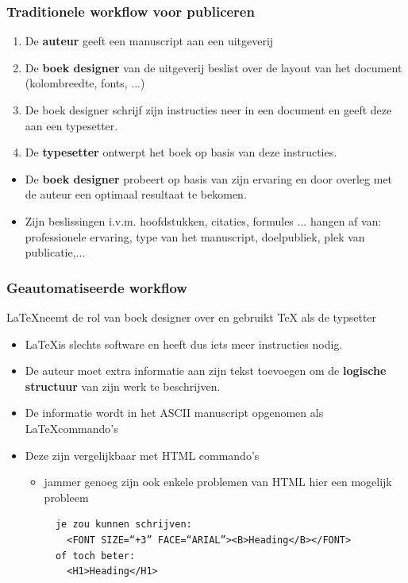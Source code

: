 \documentclass{beamer}
\begin{document}

\begin{frame}
\frametitle{Traditionele workflow voor publiceren}
\begin{enumerate}
 \item <1-> De \textbf{auteur} geeft een manuscript aan een uitgeverij
 \item <2-> De \textbf{boek designer} van de uitgeverij beslist over de layout van het document (kolombreedte, fonts, ...)
 \item <3-> De boek designer schrijf zijn instructies neer in een document en geeft deze aan een typesetter.
 \item <4-> De \textbf{typesetter} ontwerpt het boek op basis van deze instructies.
\end{enumerate}

\begin{itemize}[<+->]
 \item <5-> De \textbf{boek designer} probeert op basis van zijn ervaring en door overleg met de auteur een optimaal resultaat te bekomen.
 \item <5-> Zijn beslissingen i.v.m. hoofdstukken, citaties, formules ... hangen af van: professionele ervaring, type van het manuscript, doelpubliek, plek van publicatie,... 
\end{itemize}
\end{frame}


\begin{frame}[fragile] 
\frametitle{Geautomatiseerde workflow}
\LaTeX neemt de rol van boek designer over en gebruikt TeX als de typsetter
\begin{itemize}[<+->]
 \item \LaTeX is slechts software en heeft dus iets meer instructies nodig.
 \item De auteur moet extra informatie aan zijn tekst toevoegen om de \textbf{logische structuur} van zijn werk te beschrijven.
 \item De informatie wordt in het ASCII manuscript opgenomen als \LaTeX commando's
 \item Deze zijn vergelijkbaar met HTML commando's
 \begin{itemize}
 \item jammer genoeg zijn ook enkele problemen van HTML hier een mogelijk probleem
  \begin{verbatim}
  je zou kunnen schrijven:
    <FONT SIZE=“+3” FACE=“ARIAL”><B>Heading</B></FONT>
  of toch beter: 
    <H1>Heading</H1>
 \end{verbatim}
\end{itemize}
\end{itemize}
\end{frame}
\end{document}
